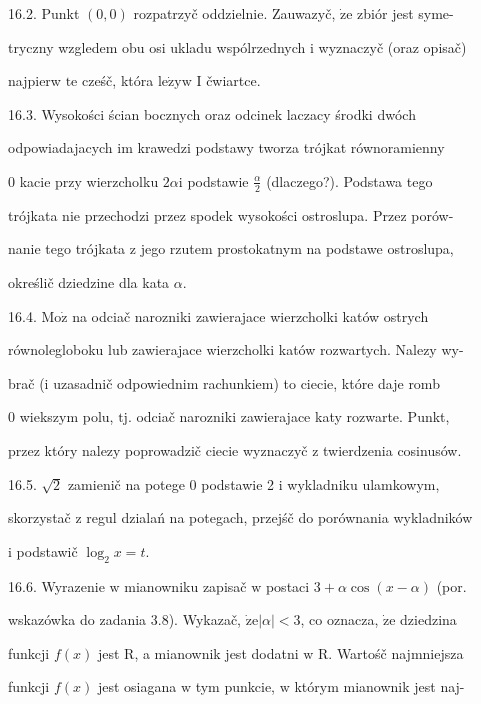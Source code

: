 \documentclass[a4paper,12pt]{article}
\begin{document}
16.2. Punkt $(0,0)$ rozpatrzyč oddzielnie. Zauwazyč, $\dot{\mathrm{z}}\mathrm{e}$ zbiór jest syme-

tryczny wzgledem obu osi ukladu wspólrzednych $\mathrm{i}$ wyznaczyč (oraz opisač)

najpierw $\mathrm{t}\mathrm{e}$ cześč, która $\mathrm{l}\mathrm{e}\dot{\mathrm{z}}\mathrm{y}\mathrm{w}$ I čwiartce.

16.3. Wysokości ścian bocznych oraz odcinek laczacy środki dwóch

odpowiadajacych im krawedzi podstawy tworza trójkat równoramienny

$0$ kacie przy wierzcholku $ 2\alpha \mathrm{i}$ podstawie $\displaystyle \frac{\alpha}{2}$ (dlaczego?). Podstawa tego

trójkata nie przechodzi przez spodek wysokości ostroslupa. Przez porów-

nanie tego trójkata $\mathrm{z}$ jego rzutem prostokatnym na podstawe ostroslupa,

określič dziedzine dla kata $\alpha.$

16.4. $\mathrm{M}\mathrm{o}\dot{\mathrm{z}}$ na odciač narozniki zawierajace wierzcholki katów ostrych

równolegloboku lub zawierajace wierzcholki katów rozwartych. Nalezy wy-

brač ($\mathrm{i}$ uzasadnič odpowiednim rachunkiem) to ciecie, które daje romb

$0$ wiekszym polu, $\mathrm{t}\mathrm{j}$. odciač narozniki zawierajace katy rozwarte. Punkt,

przez który nalezy poprowadzič ciecie wyznaczyč $\mathrm{z}$ twierdzenia cosinusów.

16.5. $\sqrt{2}$ zamienič na potege $0$ podstawie 2 $\mathrm{i}$ wykladniku ulamkowym,

skorzystač $\mathrm{z}$ regul dzialań na potegach, przejśč do porównania wykladników

$\mathrm{i}$ podstawič $\log_{2}x=t.$

16.6. Wyrazenie $\mathrm{w}$ mianowniku zapisač $\mathrm{w}$ postaci $3+\alpha\cos(x-\alpha)$ (por.

wskazówka do zadania 3.8). Wykazač, $\dot{\mathrm{z}}\mathrm{e} |\alpha| <3$, co oznacza, $\dot{\mathrm{z}}\mathrm{e}$ dziedzina

funkcji $f(x)$ jest $\mathrm{R}$, a mianownik jest dodatni $\mathrm{w}$ R. Wartośč najmniejsza

funkcji $f(x)$ jest osiagana $\mathrm{w}$ tym punkcie, $\mathrm{w}$ którym mianownik jest naj-
\end{document}

